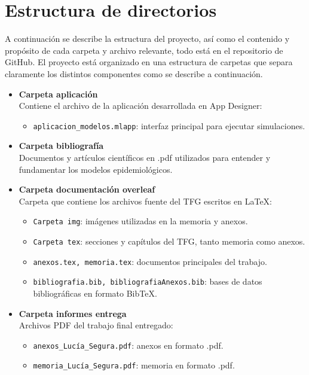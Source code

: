 
\section{Estructura de directorios}
A continuación se describe la estructura del proyecto, así como el contenido y propósito de cada carpeta y archivo relevante, todo está en el repositorio de GitHub. El proyecto está organizado en una estructura de carpetas que separa claramente los distintos componentes como se describe a continuación.

\begin{itemize}
    \item \textbf{Carpeta aplicación} \\
    Contiene el archivo de la aplicación desarrollada en App Designer:
    \begin{itemize}
        \item \texttt{aplicacion\_modelos.mlapp}: interfaz principal para ejecutar simulaciones.
    \end{itemize}

    \item \textbf{Carpeta bibliografía} \\
    Documentos y artículos científicos en .pdf utilizados para entender y fundamentar los modelos epidemiológicos.

    \item \textbf{Carpeta documentación overleaf} \\
    Carpeta que contiene los archivos fuente del TFG escritos en LaTeX:
    \begin{itemize}
        \item \texttt{Carpeta img}: imágenes utilizadas en la memoria y anexos.
        \item \texttt{Carpeta tex}: secciones y capítulos del TFG, tanto memoria como anexos.
        \item \texttt{anexos.tex, memoria.tex}: documentos principales del trabajo.
        \item \texttt{bibliografia.bib, bibliografiaAnexos.bib}: bases de datos bibliográficas en formato BibTeX.
    \end{itemize}

    \item \textbf{Carpeta informes entrega} \\
    Archivos PDF del trabajo final entregado:
    \begin{itemize}
        \item \texttt{anexos\_Lucía\_Segura.pdf}: anexos en formato .pdf.
        \item \texttt{memoria\_Lucía\_Segura.pdf}: memoria en formato .pdf.
    \end{itemize}


\end{itemize}
